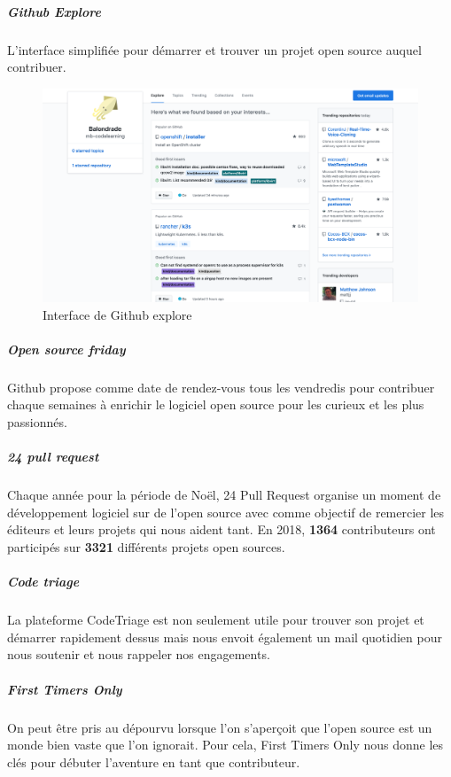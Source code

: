 				\newpage

				\subparagraph{Github Explore\\}
				L'interface simplifiée pour démarrer et trouver un projet open source auquel contribuer.

				\begin{figure}[!htb]
					\center
					\includegraphics[scale=0.30]{./img/gh_explore_os}
					\caption{Interface de Github explore}					
				\end{figure}

				\subparagraph{Open source friday\\}
				Github propose comme date de rendez-vous tous les vendredis pour contribuer chaque semaines à enrichir le logiciel open source pour les curieux et les plus passionnés.

				\subparagraph{24 pull request\\}

				Chaque année pour la période de Noël, 24 Pull Request organise un moment de développement logiciel sur de l'open source avec comme objectif de remercier les éditeurs et leurs projets qui nous aident tant.
				En 2018, \textbf{1364} contributeurs ont participés sur \textbf{3321} différents projets open sources.

				\subparagraph{Code triage\\}

				La plateforme CodeTriage est non seulement utile pour trouver son projet et démarrer rapidement dessus mais nous envoit également un mail quotidien pour nous soutenir et nous rappeler nos engagements.

				\subparagraph{First Timers Only\\}

				On peut être pris au dépourvu lorsque l'on s'aperçoit que l'open source est un monde bien vaste que l'on ignorait. Pour cela, First Timers Only nous donne les clés pour débuter l'aventure en tant que contributeur.

